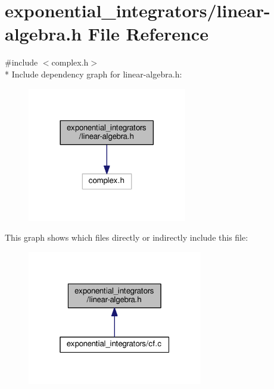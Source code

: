 \hypertarget{linear-algebra_8h}{}\section{exponential\+\_\+integrators/linear-\/algebra.h File Reference}
\label{linear-algebra_8h}
{\ttfamily \#include $<$complex.\+h$>$}\\*
Include dependency graph for linear-\/algebra.h\+:\nopagebreak
\begin{figure}[H]
\begin{center}
\leavevmode
\includegraphics[width=197pt]{linear-algebra_8h__incl}
\end{center}
\end{figure}
This graph shows which files directly or indirectly include this file\+:\nopagebreak
\begin{figure}[H]
\begin{center}
\leavevmode
\includegraphics[width=217pt]{linear-algebra_8h__dep__incl}
\end{center}
\end{figure}
